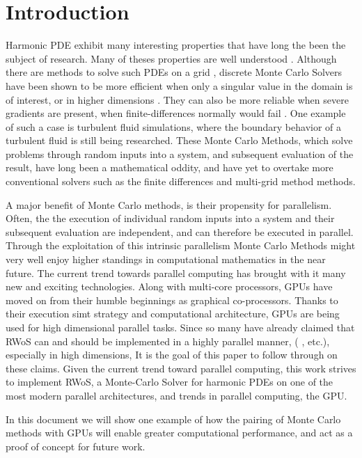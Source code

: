 
\chapter{Introduction}
\label{chapter:Introduction}


Harmonic \Gls{PDE} exhibit many interesting properties that
have long the been the subject of research.  Many of theses properties are well
understood \cite{Axler1992,Sheldon}.  Although there are methods to solve such
\Glspl{PDE} on a grid \cite{Bornemann}, discrete Monte Carlo Solvers have been shown
to be more efficient when only a
singular value in the domain is of interest, or in higher dimensions \cite{Bornemann, DeLaurentis, kakutani1944}.  They can also
be more reliable when severe gradients are present,
when finite-differences normally would fail \cite{DeLaurentis}. One example of such a case is
 turbulent fluid simulations, where the boundary behavior of a turbulent
fluid is still being researched.  These Monte Carlo Methods, which solve problems
through random inputs into a system, and subsequent evaluation of the result,
have long been a mathematical oddity, and have yet
to overtake more conventional solvers such as the finite differences and multi-grid method
methods.
\par
A major benefit of Monte Carlo methods, is their propensity for parallelism.  Often,
the the execution of individual random inputs into a system  and their subsequent evaluation
are independent, and can therefore be executed in parallel.  Through the exploitation of this
intrinsic parallelism Monte Carlo Methods might very well enjoy higher standings
in computational mathematics in the near future.
The current trend towards parallel computing has brought with it many new and exciting
technologies.  Along with multi-core processors, \Glspl{GPU} have moved on from
their humble beginnings as graphical co-processors.  Thanks to their execution
\Gls{simt} strategy and computational architecture, \Glspl{GPU} are being used for
high dimensional parallel tasks. Since so many have already
claimed that \Gls{RWoS} can and should be implemented in a highly parallel manner,
( \cite{DeLaurentis,Sabelfeld}, etc.), especially in high dimensions,  It is the goal
 of this paper to follow through on these claims.  Given the
current trend toward parallel computing, this work strives to implement
\Gls{RWoS}, a Monte-Carlo Solver for harmonic \Glspl{PDE} on one of the most modern
parallel architectures, and trends in parallel computing, the \Gls{GPU}.
\par
In this document we will show
one example of how the pairing of Monte Carlo methods with \Glspl{GPU} will enable
greater computational performance, and act as a proof of concept for future work.





